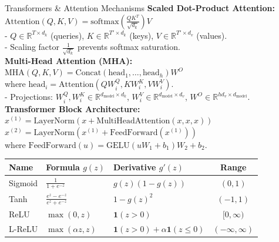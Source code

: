 \documentclass[10pt]{article}
\begin{document}
\begin{multicols*}{3}
\begin{dlBox}{Transformers \& Attention Mechanisms}
\textbf{Scaled Dot-Product Attention:} \\
$\text{Attention}(Q, K, V) = \text{softmax}\left( \frac{Q K^T}{\sqrt{d_k}} \right) V$ \\
- $Q \in \mathbb{R}^{T \times d_k}$ (queries), $K \in \mathbb{R}^{T' \times d_k}$ (keys), $V \in \mathbb{R}^{T' \times d_v}$ (values). \\
- Scaling factor $\frac{1}{\sqrt{d_k}}$ prevents softmax saturation. \\
\textbf{Multi-Head Attention (MHA):} \\
$\text{MHA}(Q, K, V) = \text{Concat}(\text{head}_1, \dots, \text{head}_h) W^O$ \\
where $\text{head}_i = \text{Attention}(Q W_i^Q, K W_i^K, V W_i^V)$. \\
- Projections: $W_i^Q, W_i^K \in \mathbb{R}^{d_{\text{model}} \times d_k}$, $W_i^V \in \mathbb{R}^{d_{\text{model}} \times d_v}$, $W^O \in \mathbb{R}^{h d_v \times d_{\text{model}}}$. \\
\textbf{Transformer Block Architecture:} \\
$x^{(1)} = \text{LayerNorm}(x + \text{MultiHeadAttention}(x, x, x))$ \\
$x^{(2)} = \text{LayerNorm}(x^{(1)} + \text{FeedForward}(x^{(1)}))$ \\
where $\text{FeedForward}(u) = \text{GELU}(u W_1 + b_1) W_2 + b_2$.
\end{dlBox}

\begin{center}
\begin{tcolorbox}[
    colframe=black!60,
    colback=white,
    title=Activation Quick Reference,
    fonttitle=\bfseries\sffamily\scriptsize,
    fontupper=\scriptsize,
    left=2pt,
    right=2pt,
    top=2pt,
    bottom=2pt,
    arc=2pt,
    boxrule=0.6pt
]
\begin{tabular}{p{1.2cm} p{2.1cm} p{1.6cm} c}
\toprule
\textbf{Name} & \textbf{Formula} $g(z)$ & \textbf{Derivative} $g'(z)$ & \textbf{Range} \\
\midrule
Sigmoid & $\frac{1}{1 + e^{-z}}$ & $g(z)(1 - g(z))$ & $(0, 1)$ \\
Tanh & $\frac{e^z - e^{-z}}{e^z + e^{-z}}$ & $1 - g(z)^2$ & $(-1, 1)$ \\
ReLU & $\max(0, z)$ & $\mathbf{1}(z > 0)$ & $[0, \infty)$ \\
L-ReLU & $\max(\alpha z, z)$ & $\mathbf{1}(z > 0) + \alpha \mathbf{1}(z \le 0)$ & $(-\infty, \infty)$ \\
\bottomrule
\end{tabular}
\end{tcolorbox}
\end{center}

\end{multicols*}
\end{document}
